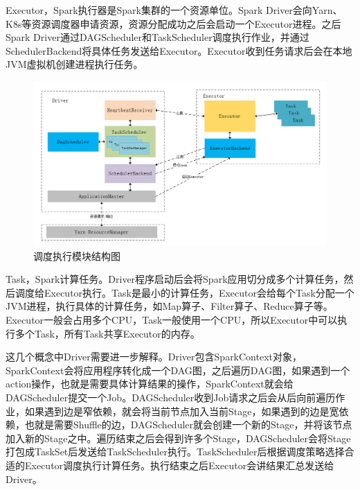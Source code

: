 Executor，Spark执行器是Spark集群的一个资源单位。Spark Driver会向Yarn、K8s等资源调度器申请资源，资源分配成功之后会启动一个Executor进程。之后Spark Driver通过DAGScheduler和TaskScheduler调度执行作业，并通过SchedulerBackend将具体任务发送给Executor。Executor收到任务请求后会在本地JVM虚拟机创建进程执行任务。

\begin{figure}[htbp]
    \centering
    \includegraphics[width=1\textwidth]{Img/spark-scheduler-detail.png}
    \caption{调度执行模块结构图}
    \label{fig:scheduler-models}
\end{figure}

Task，Spark计算任务。Driver程序启动后会将Spark应用切分成多个计算任务，然后调度给Executor执行。Task是最小的计算任务，Executor会给每个Task分配一个JVM进程，执行具体的计算任务，如Map算子、Filter算子、Reduce算子等。Executor一般会占用多个CPU，Task一般使用一个CPU，所以Executor中可以执行多个Task，所有Task共享Executor的内存。

这几个概念中Driver需要进一步解释。Driver包含SparkContext对象，SparkContext会将应用程序转化成一个DAG图，之后遍历DAG图，如果遇到一个action操作，也就是需要具体计算结果的操作，SparkContext就会给DAGScheduler提交一个Job。DAGScheduler收到Job请求之后会从后向前遍历作业，如果遇到边是窄依赖，就会将当前节点加入当前Stage，如果遇到的边是宽依赖，也就是需要Shuffle的边，DAGScheduler就会创建一个新的Stage，并将该节点加入新的Stage之中。遍历结束之后会得到许多个Stage，DAGScheduler会将Stage打包成TaskSet后发送给TaskScheduler执行。TaskScheduler后根据调度策略选择合适的Executor调度执行计算任务。执行结束之后Executor会讲结果汇总发送给Driver。

